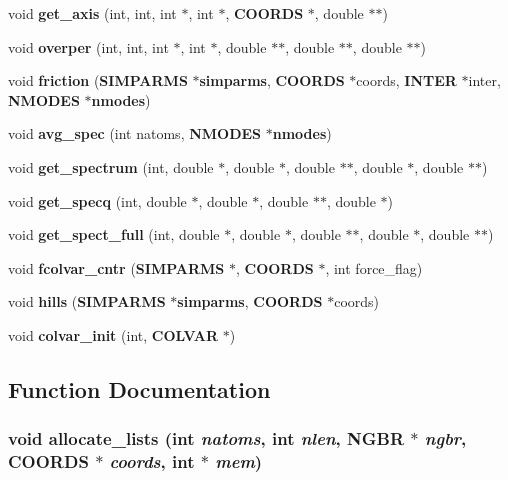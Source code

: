 \begin{CompactItemize}
\item 
void {\bf get\_\-axis} (int, int, int $\ast$, int $\ast$, {\bf COORDS} $\ast$, double $\ast$$\ast$)
\item 
void {\bf overper} (int, int, int $\ast$, int $\ast$, double $\ast$$\ast$, double $\ast$$\ast$, double $\ast$$\ast$)
\item 
void {\bf friction} ({\bf SIMPARMS} $\ast${\bf simparms}, {\bf COORDS} $\ast$coords, {\bf INTER} $\ast$inter, {\bf NMODES} $\ast${\bf nmodes})
\item 
void {\bf avg\_\-spec} (int natoms, {\bf NMODES} $\ast${\bf nmodes})
\item 
void {\bf get\_\-spectrum} (int, double $\ast$, double $\ast$, double $\ast$$\ast$, double $\ast$, double $\ast$$\ast$)
\item 
void {\bf get\_\-specq} (int, double $\ast$, double $\ast$, double $\ast$$\ast$, double $\ast$)
\item 
void {\bf get\_\-spect\_\-full} (int, double $\ast$, double $\ast$, double $\ast$$\ast$, double $\ast$, double $\ast$$\ast$)
\item 
void {\bf fcolvar\_\-cntr} ({\bf SIMPARMS} $\ast$, {\bf COORDS} $\ast$, int force\_\-flag)
\item 
void {\bf hills} ({\bf SIMPARMS} $\ast${\bf simparms}, {\bf COORDS} $\ast$coords)
\item 
void {\bf colvar\_\-init} (int, {\bf COLVAR} $\ast$)
\end{CompactItemize}


\subsection{Function Documentation}
\subsubsection{\setlength{\rightskip}{0pt plus 5cm}void allocate\_\-lists (int {\em natoms}, int {\em nlen}, {\bf NGBR} $\ast$ {\em ngbr}, {\bf COORDS} $\ast$ {\em coords}, int $\ast$ {\em mem})}\label{test_2dzug_2proto__energy_8h_8540220cab7e209c3a9f81f034bc582f}


